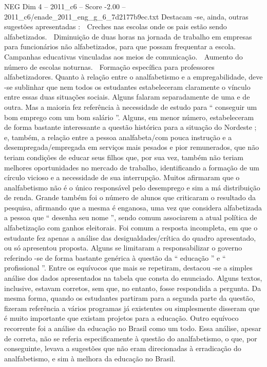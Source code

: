 \begin{textsample}{NEG Dim 4 – 2011\_c6 – Score -2.00 – 2011\_c6/enade\_2011\_eng\_g\_6\_7d2177b9ec.txt}
Destacam -se, ainda, outras sugestões apresentadas :  Creches nas escolas onde os pais estão sendo alfabetizados.  Diminuição de duas horas na jornada de trabalho em empresas para funcionários não alfabetizados, para que possam frequentar a escola.  Campanhas educativas vinculadas aos meios de comunicação.  Aumento do número de escolas noturnas.  Formação específica para professores alfabetizadores.
Quanto à relação entre o analfabetismo e a empregabilidade, deve -se sublinhar que nem todos os estudantes estabeleceram claramente o vínculo entre essas duas situações sociais.
Alguns falaram separadamente de uma e de outra.
Mas a maioria fez referência à necessidade de estudo para “ conseguir um bom emprego com um bom salário ”.
Alguns, em menor número, estabeleceram de forma bastante interessante a questão histórica para a situação do Nordeste ; e, também, a relação entre a pessoa analfabeta/com pouca instrução e a desempregada/empregada em serviços mais pesados e pior remunerados, que não teriam condições de educar seus filhos que, por sua vez, também não teriam melhores oportunidades no mercado de trabalho, identificando a formação de um círculo vicioso e a necessidade de sua interrupção.
Muitos afirmaram que o analfabetismo não é o único responsável pelo desemprego e sim a má distribuição de renda.
Grande também foi o número de alunos que criticaram o resultado da pesquisa, afirmando que a mesma é enganosa, uma vez que considera alfabetizada a pessoa que “ desenha seu nome ”, sendo comum associarem a atual política de alfabetização com ganhos eleitorais.
Foi comum a resposta incompleta, em que o estudante fez apenas a análise das desigualdades/crítica do quadro apresentado, ou só apresentou proposta.
Alguns se limitaram a responsabilizar o governo referindo -se de forma bastante genérica à questão da “ educação ” e “ profissional ”.
Entre os equívocos que mais se repetiram, destacou -se a simples análise dos dados apresentados na tabela que consta do enunciado.
Alguns textos, inclusive, estavam corretos, sem que, no entanto, fosse respondida a pergunta.
Da mesma forma, quando os estudantes partiram para a segunda parte da questão, fizeram referência a vários programas já existentes ou simplesmente disseram que é muito importante que existam projetos para a educação.
Outro equívoco recorrente foi a análise da educação no Brasil como um todo.
Essa análise, apesar de correta, não se referia especificamente à questão do analfabetismo, o que, por conseguinte, levava a sugestões que não eram direcionadas à erradicação do analfabetismo, e sim à melhora da educação no Brasil.

\end{textsample}
